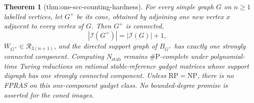 \documentclass{article}
\newtheorem{theorem}{Theorem}
\begin{document}
\begin{theorem}[thm:one-scc-counting-hardness]\label{thm:one-scc-counting-hardness}
For every simple graph \(G\) on \(n\geq1\) labelled vertices, let \(G^+\) be its cone, obtained by adjoining one new vertex \(x\) adjacent to every vertex of \(G\). Then \(G^+\) is connected,
\[
 |\mathcal I(G^+)|=|\mathcal I(G)|+1,
\]
\(W_{G^+}\in\mathcal R_{3(n+1)}\), and the directed support graph of \(B_{G^+}\) has exactly one strongly connected component. Computing \(N_{\mathrm{stab}}\) remains \(\#\mathrm P\)-complete under polynomial-time Turing reductions on rational stable-reference gadget matrices whose support digraph has one strongly connected component. Unless \(\mathrm{RP}=\mathrm{NP}\), there is no FPRAS on this one-component gadget class. No bounded-degree promise is asserted for the coned images.
\end{theorem}
\end{document}
